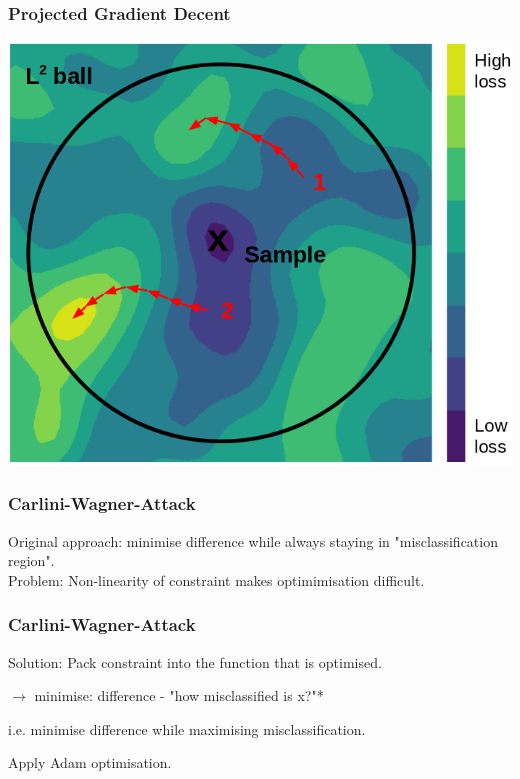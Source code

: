 \documentclass[10pt,usepdftitle=false,aspectratio=169]{beamer}
\begin{document}
\begin{frame}[fragile]
	\frametitle{Projected Gradient Decent}
	
	\begin{center}
		\includegraphics[height=0.75 	\textheight]{plots/pgd_pic.png}
	\end{center}

\end{frame}


\begin{frame}[fragile]
	\frametitle{Carlini-Wagner-Attack}
	
	\large Original approach: minimise difference while always staying in "misclassification region". \\
	
	\medskip
	Problem: Non-linearity of constraint makes optimimisation difficult.
	
\end{frame}

\begin{frame}[fragile]
	\frametitle{Carlini-Wagner-Attack}
	
	\large Solution: Pack constraint into the function that is optimised.\\
	
	\bigskip
	
	$\rightarrow$ minimise: difference - "how misclassified is x?"*\\
	\smallskip
	
	i.e. minimise difference while maximising misclassification.\\
	\bigskip
	
	Apply Adam optimisation.
	
\end{frame}
\end{document}
